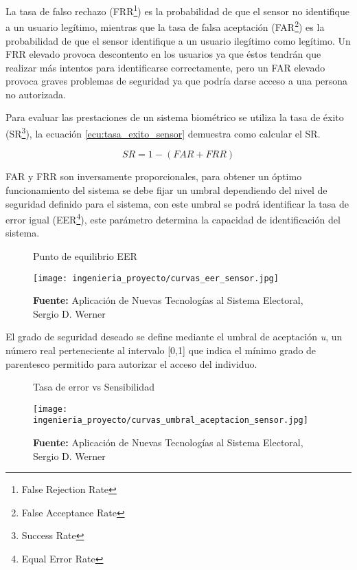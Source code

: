 \documentclass[../principal]{subfiles}
\begin{document}
  La tasa de falso rechazo (FRR\footnote{False Rejection Rate}) es la probabilidad de que el sensor no identifique a un usuario legítimo, mientras que la tasa de falsa aceptación (FAR\footnote{False Acceptance Rate}) es la probabilidad de que el sensor identifique a un usuario ilegítimo como legítimo. Un FRR elevado provoca descontento en los usuarios ya que éstos tendrán que realizar más intentos para identificarse correctamente, pero un FAR elevado provoca graves problemas de seguridad ya que podría darse acceso a una persona no autorizada.

  Para evaluar las prestaciones de un sistema biométrico se utiliza la tasa de éxito (SR\footnote{Success Rate}), la ecuación \ref{ecu:tasa_exito_sensor} demuestra como calcular el SR.

  \vspace{-1.5em}
  \begin{equation}
    \label{ecu:tasa_exito_sensor}
    SR = 1 - (FAR + FRR)
  \end{equation}
  \vspace{-2em}

  FAR y FRR son inversamente proporcionales, para obtener un óptimo funcionamiento del sistema se debe fijar un umbral dependiendo del nivel de seguridad definido para el sistema, con este umbral se podrá identificar la tasa de error igual (EER\footnote{Equal Error Rate}), este parámetro determina la capacidad de identificación del sistema.

  \begin{figure}[H]
    \centering
    \caption{Punto de equilibrio EER}
    \texttt{[image: ingenieria\_proyecto/curvas\_eer\_sensor.jpg]}
    \caption*{\textbf{Fuente:} Aplicación de Nuevas Tecnologías al Sistema Electoral, Sergio D. Werner\cite{web:aplicacion_sistema_electoral_biometrico}}
  \end{figure}

  El grado de seguridad deseado se define mediante el umbral de aceptación \textit{u}, un número real perteneciente al intervalo [0,1] que indica el mínimo grado de parentesco permitido para autorizar el acceso del individuo.\cite{web:aplicacion_sistema_electoral_biometrico}

  \begin{figure}[H]
    \centering
    \caption{Tasa de error vs Sensibilidad}
    \texttt{[image: ingenieria\_proyecto/curvas\_umbral\_aceptacion\_sensor.jpg]}
    \caption*{\textbf{Fuente:} Aplicación de Nuevas Tecnologías al Sistema Electoral, Sergio D. Werner\cite{web:aplicacion_sistema_electoral_biometrico}}
  \end{figure}
\end{document}
